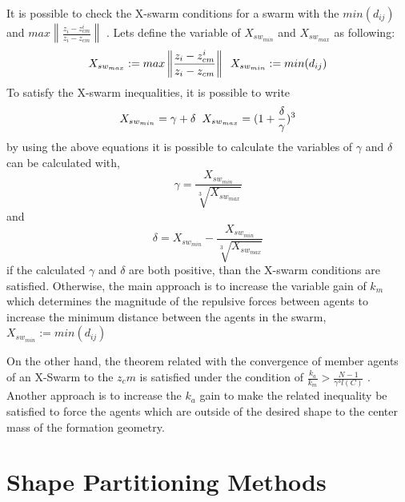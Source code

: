 \documentclass[twoside]{article}
\newcommand{\norm}[1]{\left\lVert#1\right\rVert}
\begin{document}
		It is possible to check the X-swarm conditions for a swarm  with the $min(d_{ij})$ and $max \norm{\frac{z_i - z_{cm}^i}{z_i - z_{cm}}} $ . Lets define the variable  of $X_{sw_{min}}$ and $X_{sw_{max}}$ as following:
		\begin{equation}
X_{sw_{max}} := max \norm{\frac{z_i - z_{cm}^i}{z_i - z_{cm}}}  \hspace{0.2cm} X_{sw_{min}} := min(d_{ij})
		\end{equation}
			To satisfy the X-swarm inequalities, it is possible to write 
			\begin{equation}
 X_{sw_{min}} = \gamma + \delta  \hspace{0.2cm} X_{sw_{max}} = (1 + \frac{\delta}{\gamma})^3
			\end{equation}
			by using the above equations it is possible to calculate the variables of $\gamma$ and $\delta$ can be calculated with,
			\begin{equation}
  \gamma = \frac{ X_{sw_{min}}}{\sqrt[3]{ X_{sw_{max}}}}
			\end{equation}
			and
			\begin{equation}
\delta =  X_{sw_{min}} - \frac{ X_{sw_{min}}}{\sqrt[3]{ X_{sw_{max}}}}
			\end{equation}
			if the calculated  $\gamma$ and $\delta$ are both positive, than the X-swarm conditions are satisfied. Otherwise, the main approach is to increase the variable gain of $k_m$ which determines the magnitude of the repulsive forces between agents to increase the minimum distance between the agents in the swarm, $X_{sw_{min}} := min(d_{ij})$
			
			On the other hand, the theorem related with the convergence of member agents of an X-Swarm to the $z_cm$ is satisfied under the condition of $\frac{k_a}{k_m} > \frac{N-1}{\gamma^3  l(C)}$ . Another approach is to increase the $k_a$ gain to make the related inequality be satisfied to force the agents which are outside of the desired shape to the center mass of the formation geometry. 
			
			
			
		\section{Shape Partitioning Methods}
			
\end{document}
